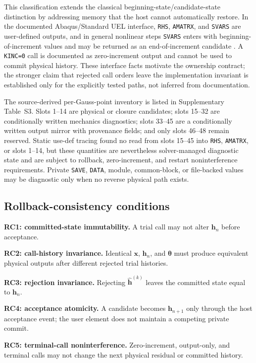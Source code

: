\documentclass[preprint,12pt,authoryear]{elsarticle}
\begin{document}
This classification extends the classical beginning-state/candidate-state distinction by addressing memory that the host cannot automatically restore. In the documented Abaqus/Standard UEL interface, \texttt{RHS}, \texttt{AMATRX}, and \texttt{SVARS} are user-defined outputs, and in general nonlinear steps \texttt{SVARS} enters with beginning-of-increment values and may be returned as an end-of-increment candidate \citep{abaqus2026uel}. A \texttt{KINC=0} call is documented as zero-increment output and cannot be used to commit physical history. These interface facts motivate the ownership contract; the stronger claim that rejected call orders leave the implementation invariant is established only for the explicitly tested paths, not inferred from documentation.

The source-derived per-Gauss-point inventory is listed in Supplementary Table~S3. Slots 1--14 are physical or closure candidates; slots 15--32 are conditionally written mechanics diagnostics; slots 33--45 are a conditionally written output mirror with provenance fields; and only slots 46--48 remain reserved. Static use-def tracing found no read from slots 15--45 into \texttt{RHS}, \texttt{AMATRX}, or slots 1--14, but these quantities are nevertheless solver-managed diagnostic state and are subject to rollback, zero-increment, and restart noninterference requirements. Private \texttt{SAVE}, \texttt{DATA}, module, common-block, or file-backed values may be diagnostic only when no reverse physical path exists.

\subsection{Rollback-consistency conditions}

\textbf{RC1: committed-state immutability.} A trial call may not alter $\mathbf{h}_n$ before acceptance.

\textbf{RC2: call-history invariance.} Identical $\mathbf{x}$, $\mathbf{h}_n$, and $\boldsymbol\theta$ must produce equivalent physical outputs after different rejected trial histories.

\textbf{RC3: rejection invariance.} Rejecting $\widehat{\mathbf{h}}^{(k)}$ leaves the committed state equal to $\mathbf{h}_n$.

\textbf{RC4: acceptance atomicity.} A candidate becomes $\mathbf{h}_{n+1}$ only through the host acceptance event; the user element does not maintain a competing private commit.

\textbf{RC5: terminal-call noninterference.} Zero-increment, output-only, and terminal calls may not change the next physical residual or committed history.
\end{document}
